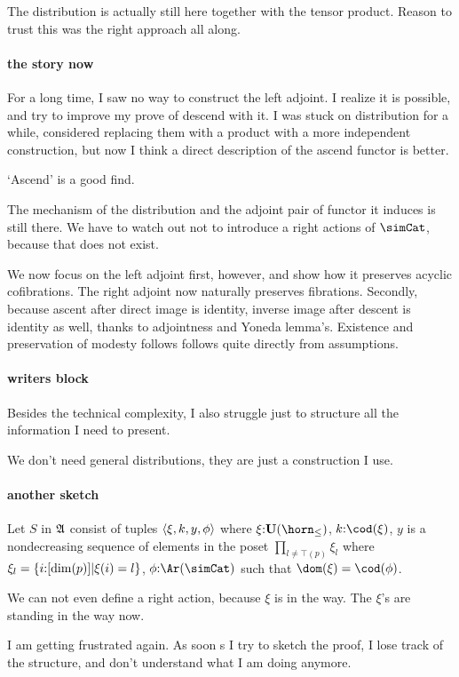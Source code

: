 \documentclass[csh.tex]{subfiles}
\begin{document}
The distribution is actually still here together with the tensor product. Reason to trust this was the right approach all along.

\paragraph{the story now}
For a long time, I saw no way to construct the left adjoint.
I realize it is possible, and try to improve my prove of descend with it. I was stuck on distribution for a while, considered replacing them
with a product with a more independent construction, but now I think a direct description of the ascend functor is better.

`Ascend' is a good find.

The mechanism of the distribution and the adjoint pair of functor it induces is still there. We have to watch out not to introduce a right actions of $\simCat$, because that does not exist.

We now focus on the left adjoint first, however, and show how it preserves acyclic cofibrations. The right adjoint now naturally preserves fibrations. Secondly, because ascent after direct image is identity, inverse image after descent is identity as well, thanks to adjointness and Yoneda lemma's. Existence and preservation of modesty follows follows quite directly from assumptions.

\paragraph{writers block} Besides the technical complexity, I also struggle just to structure all the information I need to present.


We don't need general distributions, they are just a construction I use.

\paragraph{another sketch}
Let $S$ in $\mathfrak A$ consist of tuples $\left\langle \xi,k,y,\phi \right\rangle$ where 
$\xi\of\base(\horn_{\leq})$, 
$k\of \cod(\xi)$, 
$y$ is a nondecreasing sequence of elements in the poset $\prod_{l\neq \top(p)} \xi_l$ where $\xi_l = \left\{i \mathord : [\dim(p)] | \xi(i) = l \right\}$, 
$\phi\of\Ar(\simCat)$ such that $\dom(\xi) = \cod(\phi)$.

We can not even define a right action, because $\xi$ is in the way.
The $\xi$'s are standing in the way now.

I am getting frustrated again. As soon s I try to sketch the proof, I lose track of the structure, and don't understand what I am doing anymore.
\end{document}
